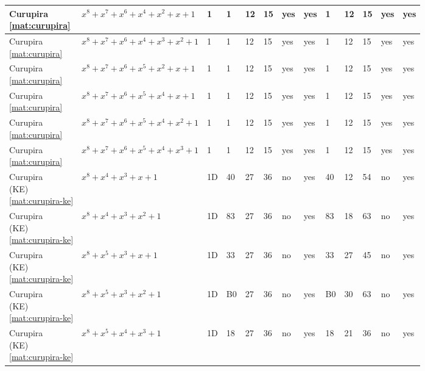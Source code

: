 \begin{tiny}
\begin{longtable}{|l|l|l|l|l|l|l|l|l|l|l|l|l|}
\shortstack{Curupira \\ \eqref{mat:curupira}} & $x^8 + x^7 + x^6 + x^4 + x^2 + x + 1$ & 1 & 1 & 12 & 15 & yes & yes & 1 & 12 & 15 & yes & yes \\ \hline
\shortstack{Curupira \\ \eqref{mat:curupira}} & $x^8 + x^7 + x^6 + x^4 + x^3 + x^2 + 1$ & 1 & 1 & 12 & 15 & yes & yes & 1 & 12 & 15 & yes & yes \\ \hline
\shortstack{Curupira \\ \eqref{mat:curupira}} & $x^8 + x^7 + x^6 + x^5 + x^2 + x + 1$ & 1 & 1 & 12 & 15 & yes & yes & 1 & 12 & 15 & yes & yes \\ \hline
\shortstack{Curupira \\ \eqref{mat:curupira}} & $x^8 + x^7 + x^6 + x^5 + x^4 + x + 1$ & 1 & 1 & 12 & 15 & yes & yes & 1 & 12 & 15 & yes & yes \\ \hline
\shortstack{Curupira \\ \eqref{mat:curupira}} & $x^8 + x^7 + x^6 + x^5 + x^4 + x^2 + 1$ & 1 & 1 & 12 & 15 & yes & yes & 1 & 12 & 15 & yes & yes \\ \hline
\shortstack{Curupira \\ \eqref{mat:curupira}} & $x^8 + x^7 + x^6 + x^5 + x^4 + x^3 + 1$ & 1 & 1 & 12 & 15 & yes & yes & 1 & 12 & 15 & yes & yes \\ \hline
\shortstack{Curupira \\ (KE) \\ \eqref{mat:curupira-ke}} & $x^8 + x^4 + x^3 + x + 1$ & 1D & 40 & 27 & 36 & no & yes & 40 & 12 & 54 & no & yes \\ \hline
\shortstack{Curupira \\ (KE) \\ \eqref{mat:curupira-ke}} & $x^8 + x^4 + x^3 + x^2 + 1$ & 1D & 83 & 27 & 36 & no & yes & 83 & 18 & 63 & no & yes \\ \hline
\shortstack{Curupira \\ (KE) \\ \eqref{mat:curupira-ke}} & $x^8 + x^5 + x^3 + x + 1$ & 1D & 33 & 27 & 36 & no & yes & 33 & 27 & 45 & no & yes \\ \hline
\shortstack{Curupira \\ (KE) \\ \eqref{mat:curupira-ke}} & $x^8 + x^5 + x^3 + x^2 + 1$ & 1D & B0 & 27 & 36 & no & yes & B0 & 30 & 63 & no & yes \\ \hline
\shortstack{Curupira \\ (KE) \\ \eqref{mat:curupira-ke}} & $x^8 + x^5 + x^4 + x^3 + 1$ & 1D & 18 & 27 & 36 & no & yes & 18 & 21 & 36 & no & yes \\ \hline

\end{longtable}
\end{tiny}
